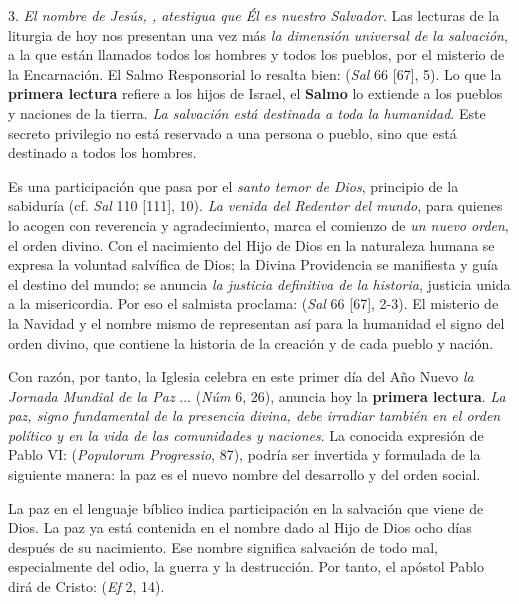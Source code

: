 \begin{body}
	3. \emph{El nombre de Jesús, , atestigua que Él es nuestro Salvador}. Las lecturas de la liturgia de hoy nos presentan una vez más \emph{la dimensión universal de la salvación}, a la que están llamados todos los hombres y todos los pueblos, por el misterio de la Encarnación. El Salmo Responsorial lo resalta bien:  (\emph{Sal} 66 {[}67{]}, 5). Lo que la \textbf{primera lectura} refiere a los hijos de Israel, el \textbf{Salmo} lo extiende a los pueblos y naciones de la tierra. \emph{La salvación está destinada a toda la humanidad}. Este secreto privilegio no está reservado a una persona o pueblo, sino que está destinado a todos los hombres.
	
	Es una participación que pasa por el \emph{santo temor de Dios}, principio de la sabiduría (cf. \emph{Sal} 110 {[}111{]}, 10). \emph{La venida del Redentor del mundo}, para quienes lo acogen con reverencia y agradecimiento, marca el comienzo de \emph{un nuevo orden}, el orden divino. Con el nacimiento del Hijo de Dios en la naturaleza humana se expresa la voluntad salvífica de Dios; la Divina Providencia se manifiesta y guía el destino del mundo; se anuncia \emph{la justicia definitiva de la historia}, justicia unida a la misericordia. Por eso el salmista proclama:  (\emph{Sal} 66 {[}67{]}, 2-3). El misterio de la Navidad y el nombre mismo de  representan así para la humanidad el signo del orden divino, que contiene la historia de la creación y de cada pueblo y nación.
	
	Con razón, por tanto, la Iglesia celebra en este primer día del Año Nuevo \emph{la Jornada Mundial de la Paz} ...  (\emph{Núm} 6, 26), anuncia hoy la \textbf{primera lectura}. \emph{La paz, signo fundamental de la presencia divina, debe irradiar también en el orden político y en la vida de las comunidades y naciones}. La conocida expresión de Pablo VI:  (\emph{Populorum Progressio}, 87), podría ser invertida y formulada de la siguiente manera: la paz es el nuevo nombre del desarrollo y del orden social.
	
	La paz en el lenguaje bíblico indica participación en la salvación que viene de Dios. La paz ya está contenida en el nombre dado al Hijo de Dios ocho días después de su nacimiento. Ese nombre significa salvación de todo mal, especialmente del odio, la guerra y la destrucción. Por tanto, el apóstol Pablo dirá de Cristo:  (\emph{Ef} 2, 14).
	

\end{body}
